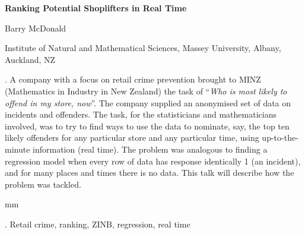 \documentclass[12pt]{article}
\begin{document}
\begin{flushleft}


{\LARGE\bf Ranking Potential Shoplifters in Real Time}


\vspace{1.0cm}

Barry McDonald 

 \vspace{0.5cm}

Institute of Natural and Mathematical Sciences, Massey University, Albany, Auckland, NZ

 

\end{flushleft}


\vspace{2 cm}

. A company with a focus on retail crime prevention brought to MINZ (Mathematics in Industry in New Zealand)  the task of ``{\it Who is most likely to offend in my store, now}''.  The company supplied an anonymised set of data on incidents and offenders. The task, for the statisticians and mathematicians involved, was to try to find ways to use the data to nominate, say, the top ten likely offenders for any particular store and any particular time, using up-to-the-minute information (real time).  The problem was analogous to finding a regression model when every row of data has response identically 1 (an incident), and for many places and times there is no data.    This talk will describe how the problem was tackled.


 mm

.
Retail crime, ranking, ZINB, regression, real time
\end{document}
